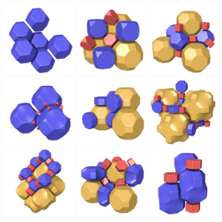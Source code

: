 \documentclass{beamer}
\begin{document}
\begin{frame}
  \begin{center}
    \includegraphics[width=1.0in]{simple1}
    \includegraphics[width=1.0in]{simple2}
    \includegraphics[width=1.0in]{simple3}\\
    \includegraphics[width=1.0in]{simple4}
    \includegraphics[width=1.0in]{simple5}
    \includegraphics[width=1.0in]{simple6}\\
    \includegraphics[width=1.0in]{simple7}
    \includegraphics[width=1.0in]{simple8}
    \includegraphics[width=1.0in]{simple9}\\


\end{center}
\end{frame}
\end{document}
